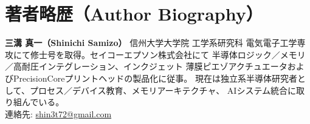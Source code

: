 \documentclass[conference]{IEEEtran}
\begin{document}
\section*{著者略歴（Author Biography）}
\textbf{三溝 真一（Shinichi Samizo）} 信州大学大学院 工学系研究科
電気電子工学専攻にて修士号を取得。セイコーエプソン株式会社にて
半導体ロジック／メモリ／高耐圧インテグレーション、インクジェット
薄膜ピエゾアクチュエータおよびPrecisionCoreプリントヘッドの製品化に従事。
現在は独立系半導体研究者として、プロセス／デバイス教育、メモリアーキテクチャ、
AIシステム統合に取り組んでいる。\\
連絡先: \href{mailto:shin3t72@gmail.com}{shin3t72@gmail.com}
\end{document}
